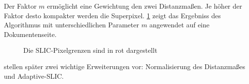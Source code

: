 Der Faktor \(m\) ermöglicht eine Gewichtung den zwei Distanzmaßen. Je höher
der Faktor desto kompakter werden die Superpixel. \cref{fig:slic_parameters}
zeigt das Ergebniss des Algorithmus mit unterschiedlichen Parameter  \(m\)
angewendet auf eine Dokumentenseite.

\begin{figure}
    \centering
    \caption{Die SLIC-Pixelgrenzen sind in rot dargestellt }
    \label{fig:slic_parameters}
\end{figure}

\citeauthor{AchantaSLICSuperpixelsCompared2012} stellen später zwei wichtige Erweiterungen vor:
Normalisierung des Distanzmaßes und Adaptive-SLIC.

